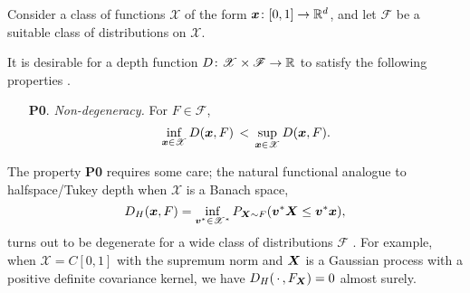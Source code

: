 Consider a class of functions $\mathscr{X}$ of the form $\bm{x}\colon [0, 1] \to
\mathbb{R}^d$, and let $\mathscr{F}$ be a suitable class of distributions on
$\mathscr{X}$.

It is desirable for a depth function $D\colon \mathscr{X} \times \mathscr{F}
\to \mathbb{R}$ to satisfy the following properties \parencite{gijbels-nagy-2017}.
\begin{enumerate}
    \item[\textbf{P0}.] \emph{Non-degeneracy.}
    For $F \in \mathscr{F}$,
    \begin{equation}
        \inf_{\bm{x} \in \mathscr{X}} D(\bm{x}, F) \,<\,
        \sup_{\bm{x} \in \mathscr{X}} D(\bm{x}, F).
    \end{equation}
\end{enumerate}

The property \textbf{P0} requires some care; the natural functional analogue
to halfspace/Tukey depth when $\mathscr{X}$ is a Banach space,
\begin{equation}
    D_H(\bm{x}, F) = \inf_{\bm{v}^* \in \mathscr{X}^*} P_{\bm{X} \sim F}(\bm{v}^*\bm{X} \leq \bm{v}^*\bm{x}),
\end{equation}
turns out to be degenerate for a wide class of distributions $\mathscr{F}$
\parencite{chakraborty-chaudhuri-2014a}.
For example, when $\mathscr{X} = C[0, 1]$ with the supremum norm and $\bm{X}$ is
a Gaussian process with a positive definite covariance kernel, we have
$D_H(\,\cdot\,, F_{\bm{X}}) = 0$ almost surely.









